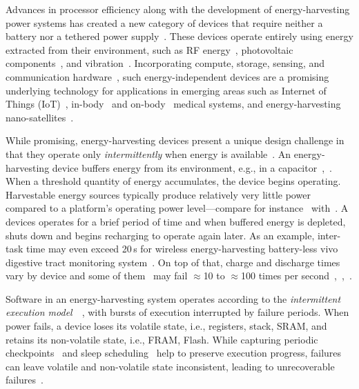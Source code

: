 Advances in processor efficiency along with the development of energy-harvesting power systems has created a new category of devices that require neither a battery nor a tethered power supply~\cite{prasad_comst_2014,lucia_snapl_2017,soyata_csm_2016}. These devices operate entirely using energy extracted from their environment, such as RF energy~\cite{rf_powered_computing_gollakota_2014}, photovoltaic components~\cite{margolies_infocom_2016,margolies_tosn_2016}, and vibration~\cite{gorlatova_sigmetrics_2014}. Incorporating compute, storage, sensing, and communication hardware~\cite{wisp5,moo}, such energy-independent devices are a promising underlying technology for applications in emerging areas such as Internet of Things (IoT)~\cite{ku_cst_2016}, in-body~\cite{nadeau_naturebio_2017} and on-body~\cite{bandodkar_electroanalysis_2015} medical systems, and energy-harvesting nano-satellites~\cite{kicksat}.

While promising, energy-harvesting devices present a unique design challenge in
that they operate only {\em intermittently} when energy is available~\cite{hicks_isca_2017,lucia_snapl_2017}. An
energy-harvesting device buffers energy from its environment, e.g., in a
capacitor~\cite[Fig. 3]{gorlatova_tmc_2013},~\cite[Fig. 1]{gunduz_commag_2014}. When a threshold quantity of energy accumulates, the device begins operating. Harvestable energy sources typically produce relatively very little power compared to a platform's operating power level---compare for instance~\cite[Table III and V]{prasad_comst_2014} with~\cite[Table I]{carrano_cst_2014}. A devices operates for a brief period of time and when buffered energy is depleted, shuts down and begins recharging to operate again later. As an example, inter-task time may even exceed 20\,s for wireless energy-harvesting battery-less vivo digestive tract monitoring system~\cite[Fig. 3c]{nadeau_naturebio_2017}. On top of that, charge and discharge times vary by device and some of them~\cite{wisp} may fail $\approx$10 to $\approx$100 times per second~\cite[Fig. 1]{tan_infocom_2016},~\cite[Fig. 1]{mementos},~\cite[Fig. 3]{nvp}.


Software in an energy-harvesting system operates according to the {\em
intermittent execution model}~\cite[Sec. 2]{dino}~\cite[Fig. 2]{lucia_snapl_2017}, with bursts of execution interrupted by failure periods. When power fails, a device loses its volatile state, i.e., registers, stack, SRAM, and retains its non-volatile state, i.e., FRAM, Flash. While capturing periodic checkpoints~\cite{mementos,quickrecall} and sleep scheduling~\cite{dewdrop,hibernus,hibernusplusplus} help to preserve execution progress, failures can leave volatile and non-volatile state inconsistent, leading to unrecoverable failures~\cite{mspcdino,edb}. 

